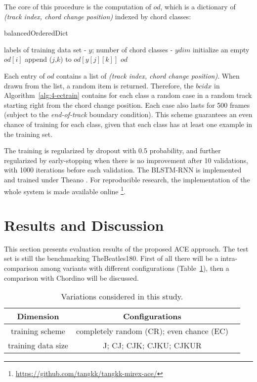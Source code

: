 The core of this procedure is the computation of $od$, which is a dictionary of \textit{(track index, chord change position)} indexed by chord classes:
\begin{algorithm}[h]
	\caption{balancedOrderedDict}
	\label{alg:4-bod}
	\begin{algorithmic}
	\REQUIRE
	labels of training data set - $y$;
	number of chord classes - $ydim$
	\STATE initialize an empty $od[i]$
	\ENDFOR
	\STATE append ($j$,$k$) to $od[y[j][k]]$
	\ENDIF
	\ENDFOR
	\ENDFOR
	\RETURN
		$od$
	\end{algorithmic}
\end{algorithm}
Each entry of $od$ contains a list of \textit{(track index, chord change position)}. When drawn from the list, a random item is returned. Therefore, the $bcidx$ in Algorithm~\ref{alg:4-ectrain} contains for each class a random case in a random track starting right from the chord change position. Each case also lasts for 500 frames (subject to the \textit{end-of-track} boundary condition). This scheme guarantees an even chance of training for each class, given that each class has at least one example in the training set.

The training is regularized by dropout with 0.5 probability, and further regularized by early-stopping when there is no improvement after 10 validations, with 1000 iterations before each validation. The BLSTM-RNN is implemented and trained under Theano \cite{bergstra2011theano}. For reproducible research, the implementation of the whole system is made available online \footnote{\url{https://github.com/tangkk/tangkk-mirex-ace/}}.

\section{Results and Discussion}\label{sec:4-eval}
This section presents evaluation results of the proposed ACE approach. The test set is still the benchmarking TheBeatles180. First of all there will be a intra-comparison among variants with different configurations (Table~\ref{tab:4-varexplore}), then a comparison with Chordino will be discussed.

\begin{table}
\caption{Variations considered in this study.}
\centering
\footnotesize
\begin{tabular}{|c|c|c|} \hline
Dimension & Configurations \\ \hline
training scheme & completely random (CR); even chance (EC) \\ \hline
training data size & J; CJ; CJK; CJKU; CJKUR \\ \hline
\end{tabular}
\label{tab:4-varexplore}
\end{table}

